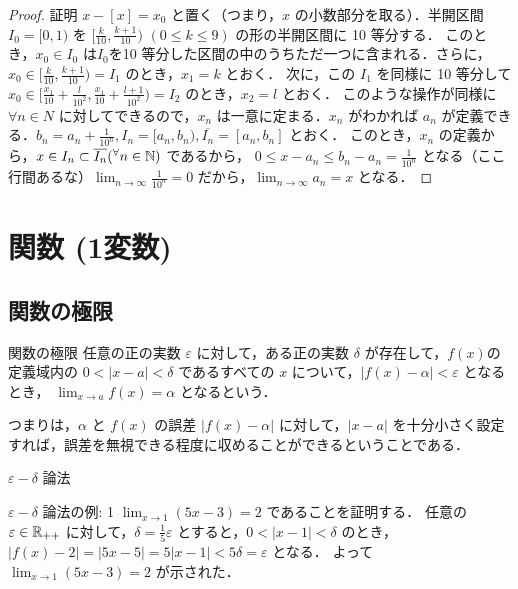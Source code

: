 \documentclass[xelatex,ja=standard,jafont=noto]{bxjsarticle}
\begin{document}
  \begin{proof}{証明}{}
   $x - [x] = x_0$ と置く（つまり，$x$ の小数部分を取る）．半開区間 $I_0 = [0, 1)$ を $[\frac{k}{10},\frac{k + 1}{10})$ \hspace{10pt} $(0 \leq k \leq 9)$ の形の半開区間に 10 等分する．
   このとき，$x_0 \in I_0$ は$I_0$を10 等分した区間の中のうちただ一つに含まれる．さらに，$x_0 \in [\frac{k}{10}, \frac{k + 1}{10}) = I_1$ のとき，$x_1 = k$ とおく．
   次に，この $I_1$ を同様に 10 等分して $x_0 \in [\frac{x_1}{10} + \frac{l}{10^2}, \frac{x_1}{10} + \frac{l + 1}{10^2}) = I_2$ のとき，$x_2 = l$ とおく．
   このような操作が同様に $\forall n \in N$ に対してできるので，$x_n$ は一意に定まる．$x_n$ がわかれば $a_n$ が定義できる．$b_n = a_n + \frac{1}{10^n}, I_n = [a_n, b_n), \overline{I_n} = [a_n, b_n]$ とおく．
   このとき，$x_n$ の定義から，$x \in I_n \subset \overline{I_n} (\forall n \in \N)$ であるから，
   $0 \leq x - a_n \leq b_n - a_n = \frac{1}{10^n}$ となる（ここ行間あるな）$\displaystyle \lim_{n \to \infty} \frac{1}{10^n} = 0$ だから，$\displaystyle \lim_{n \to \infty} a_n = x$ となる．
  \end{proof}

 \section{関数 (1変数)}
  \subsection{関数の極限}
  \begin{tcb}{関数の極限}{}
    任意の正の実数 $\varepsilon$ に対して，ある正の実数 $\delta$ が存在して，$f(x)$の定義域内の $0 < |x-a| < \delta$ であるすべての $x$ について，$|f(x) - \alpha| < \varepsilon$ となるとき，
    $\displaystyle \lim_{x \to a} f(x) = \alpha$ となるという．
  \end{tcb}
  つまりは，$\alpha$ と $f(x)$ の誤差 $|f(x) - \alpha|$ に対して，$|x-a|$ を十分小さく設定すれば，誤差を無視できる程度に収めることができるということである．

  \begin{tcb}{$\varepsilon-\delta$ 論法}{}
    
  \end{tcb}

  \begin{tcb}{$\varepsilon - \delta$ 論法の例: 1}{}
    $\displaystyle \lim_{x \to 1} (5x-3) = 2$ であることを証明する．
    任意の $\varepsilon \in \mathbb{R}_{++}$ に対して，$\delta = \frac{1}{5}\varepsilon$ とすると，$0 < |x - 1| < \delta$ のとき，$|f(x) - 2| = |5x-5| = 5|x-1| < 5\delta = \varepsilon$ となる．
    よって $\displaystyle \lim_{x \to 1} (5x-3) = 2$ が示された．
    
  \end{tcb}
\end{document}
